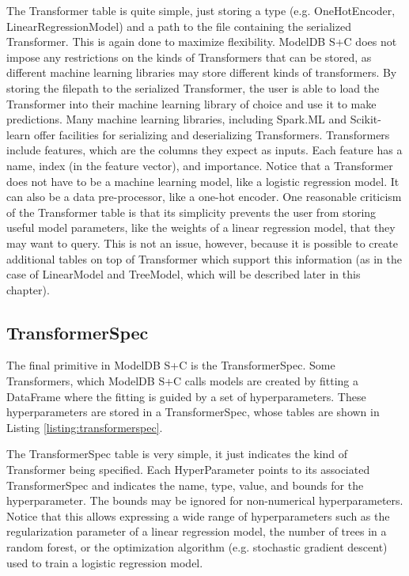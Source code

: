 The Transformer table is quite simple, just storing a type (e.g. OneHotEncoder,
LinearRegressionModel) and a path to the file containing the serialized Transformer.
This is again done to maximize flexibility. ModelDB S+C does not impose any restrictions
on the kinds of Transformers that can be stored, as different machine learning libraries
may store different kinds of transformers. By storing the filepath to the serialized Transformer,
the user is able to load the Transformer into their machine learning library of choice and use
it to make predictions. Many machine learning libraries, including Spark.ML and Scikit-learn offer
facilities for serializing and deserializing Transformers. Transformers include features, which are the
columns they expect as inputs. Each feature has a name, index (in the feature vector), and importance. 
Notice that a Transformer does not have to be a machine learning model, like a logistic regression model. 
It can also be a data pre-processor, like
a one-hot encoder. One reasonable criticism of the Transformer table is that its simplicity 
prevents the user from storing useful model parameters, like the weights of a linear regression model,
that they may want to query. This is not an issue, however, because it is possible to create
additional tables on top of Transformer which support this information (as in the case of LinearModel
and TreeModel, which will be described later in this chapter).

\subsection{TransformerSpec}
The final primitive in ModelDB S+C is the TransformerSpec. Some Transformers, which
ModelDB S+C calls models are created by fitting a DataFrame where the fitting is 
guided by a set of hyperparameters. These hyperparameters are stored in a 
TransformerSpec, whose tables are shown in Listing \ref{listing:transformerspec}.

The TransformerSpec table is very simple, it just indicates the kind of Transformer
being specified. Each HyperParameter points to its associated TransformerSpec and indicates
the name, type, value, and bounds for the hyperparameter. The bounds may be ignored
for non-numerical hyperparameters. Notice that this allows expressing a wide range
of hyperparameters such as the regularization parameter of a linear regression model, 
the number of trees in a random forest, or the optimization algorithm (e.g. stochastic 
gradient descent) used to train a logistic regression model.

